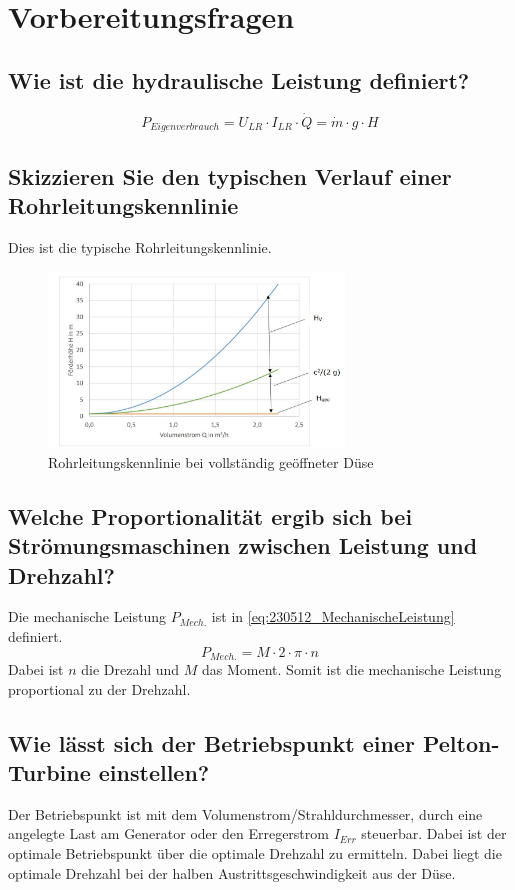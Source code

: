 \section{Vorbereitungsfragen}
\label{sec:Vorbereitungsfragen}
\subsection{Wie ist die hydraulische Leistung definiert?}
%
\begin{equation}
	P_{ Eigenverbrauch }= U_{ LR} \cdot I_{ LR }\cdot \dot Q = \dot m \cdot g \cdot H
\label{eq:2}
\end{equation}
%
\subsection{Skizzieren Sie den typischen Verlauf einer Rohrleitungskennlinie}
Dies ist die typische Rohrleitungskennlinie.
%
\begin{figure}[!ht]
		\centering
		\includegraphics[width=0.7\textwidth]{Abbildungen/Rohrleitungskennlinie}
		\caption{Rohrleitungskennlinie bei vollständig geöffneter Düse}
		\label{fig:230512_Rohrleitungskennlinie}
\end{figure}
%
\subsection{Welche Proportionalität ergib sich bei Strömungsmaschinen zwischen Leistung und Drehzahl?}
\label{subsec:P_mech-n}
Die mechanische Leistung $P_{Mech.}$ ist in \autoref{eq:230512_MechanischeLeistung} definiert.
%
\begin{equation}
	P_{Mech.}= M \cdot 2 \cdot \pi \cdot n
\label{eq:230512_MechanischeLeistung}
\end{equation}
%
Dabei ist $n$ die Drezahl und $M$ das Moment. Somit ist die mechanische Leistung proportional zu der Drehzahl.
\subsection{Wie lässt sich der Betriebspunkt einer Pelton-Turbine einstellen?}
Der Betriebspunkt ist mit dem Volumenstrom/Strahldurchmesser, durch eine angelegte Last am Generator oder den Erregerstrom $I_{Err}$ steuerbar. Dabei ist der optimale Betriebspunkt über die optimale Drehzahl zu ermitteln. Dabei liegt die optimale Drehzahl bei der halben Austrittsgeschwindigkeit aus der Düse.

